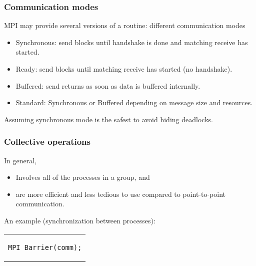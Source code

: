 \begin{frame}[fragile]
\frametitle{Communication modes}

MPI may provide several versions of a routine: different communication modes
\begin{itemize}
\item Synchronous: send blocks until handshake is done and matching receive has started.
\item Ready: send blocks until matching receive has started (no handshake).
\item Buffered: send returns as soon as data is buffered internally.
\item Standard: Synchronous or Buffered depending on message size and resources.
\end{itemize}

\medskip
Assuming synchronous mode is the safest to avoid hiding deadlocks.

\end{frame}

\begin{frame}[fragile]
  \frametitle{Collective operations}
  In general,
  \begin{itemize}
  \item Involves all of the processes in a group, and
  \item are more efficient and less tedious to use compared to point-to-point
    communication.
  \end{itemize}
  An example (synchronization between processes):
  \begin{center}
    \begin{tabular}{c}
\begin{lstlisting}[style=c,morekeywords={MPI_Barrier}]
MPI_Barrier(comm);
\end{lstlisting}
    \end{tabular}
  \end{center}
\end{frame}

